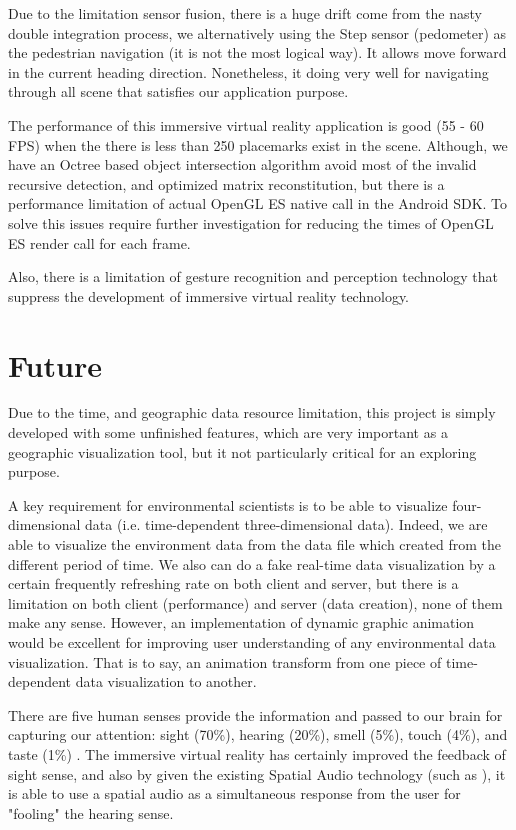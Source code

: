 Due to the limitation sensor fusion, there is a huge drift come from the nasty double integration process, we alternatively using the Step sensor (pedometer) as the pedestrian navigation (it is not the most logical way). It allows move forward in the current heading direction. Nonetheless, it doing very well for navigating through all scene that satisfies our application purpose.

The performance of this immersive virtual reality application is good (55 - 60 FPS) when the there is less than 250 placemarks exist in the scene. Although, we have an Octree based object intersection algorithm avoid most of the invalid recursive detection, and optimized matrix reconstitution, but there is a performance limitation of actual OpenGL ES native call in the Android SDK. To solve this issues require further investigation for reducing the times of OpenGL ES render call for each frame. 

Also, there is a limitation of gesture recognition and perception technology that suppress the development of immersive virtual reality technology.

\section{Future}

Due to the time, and geographic data resource limitation, this project is simply developed with some unfinished features, which are very important as a geographic visualization tool, but it not particularly critical for an exploring purpose.

A key requirement for environmental scientists is to be able to visualize four-dimensional data (i.e. time-dependent three-dimensional data). Indeed, we are able to visualize the environment data from the data file which created from the different period of time. We also can do a fake real-time data visualization by a certain frequently refreshing rate on both client and server, but there is a limitation on both client (performance) and server (data creation), none of them make any sense. However, an implementation of dynamic graphic animation would be excellent for improving user understanding of any environmental data visualization. That is to say, an animation transform from one piece of time-dependent data visualization to another.

There are five human senses provide the information and passed to our brain for capturing our attention: sight (70\%), hearing (20\%), smell (5\%), touch (4\%), and taste (1\%) \parencite{mazuryk.vr.1996}. The immersive virtual reality has certainly improved the feedback of sight sense, and also by given the existing Spatial Audio technology (such as \parencite{google.spatial-audio.2016}), it is able to use a spatial audio as a simultaneous response from the user for "fooling" the hearing sense.

